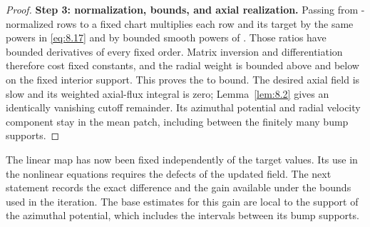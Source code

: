 \begin{proof}
\textbf{Step 3: normalization, bounds, and axial realization.} Passing from
-normalized rows to a fixed  chart multiplies each
row and its target by the same powers in \eqref{eq:8.17} and by bounded smooth powers of
. Those ratios have bounded derivatives of every fixed order. Matrix
inversion and differentiation therefore cost fixed constants, and the radial weight is bounded above
and below on the fixed interior support. This proves the  to
 bound. The desired axial field is slow and its weighted axial-flux
integral is zero; Lemma~\ref{lem:8.2} gives an identically vanishing cutoff remainder. Its azimuthal
potential and radial velocity component stay in the mean patch, including between the finitely many
bump supports.
\end{proof}

The linear map has now been fixed independently of the target values. Its use in the nonlinear
equations requires the defects of the updated field. The next statement records the exact difference
and the gain available under the bounds used in the iteration. The base estimates for this gain are
local to the support of the azimuthal potential, which includes the intervals between its bump
supports.

